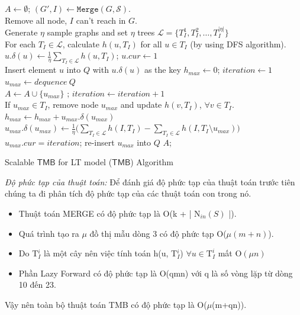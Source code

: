 \begin {itemize}
\begin{algorithm}[hpt]
	$A \leftarrow \emptyset$;	$(G', I) \leftarrow \mathtt{Merge}(G, \mathcal{S})$.
	\\
	Remove all node, $I$ can't reach in $G$.
	\\
	Generate $\eta$ sample graphs and set $\eta$ trees $\mathcal{L}=\{T_{I}^1, T_{I}^2, \ldots, T_{I}^{|\mathcal{\eta}|}\}$
	\\
	For each $ T_{I} \in \mathcal{L}$, calculate $h(u, T_{I})$ for all $u \in T_{I}$ (by using DFS algorithm).
	\\
	{
		$u.\delta(u) \leftarrow \frac{1}{\eta}\sum_{T_{I} \in \mathcal{L}} h(u, T_{I})$; $u. cur \leftarrow 1$
		\\
		Insert element $u$ into $Q$ with $u.\delta(u)$ as the key
	}
	$ h_{max} \leftarrow 0$; $iteration \leftarrow 1$
	\\
	{
		$u_{max} \leftarrow  dequence \  Q$
		\\
		{
			$A \leftarrow A \cup \{u_{max}\}$ ; $iteration \leftarrow iteration+1 $
			\\
			{
				If $u_{max} \in T_{I}$, remove node $u_{max}$ and update $h(v, T_{I})$, $ \forall v \in T_{I}$.
			}
			$h_{max} \leftarrow h_{max}+ u_{max}.\delta(u_{max})$
		}
		{
			$u_{max}. \delta(u_{max}) \leftarrow  \frac{1}{\eta}\big(\sum_{T_{I} \in \mathcal{L}}h(I, T_{I}) - \sum_{T_{I} \in \mathcal{L}} h(I, T_{I} \setminus u_{max})\big)$
			\\
			$u_{max}. cur =iteration$; re-insert $u_{max}$ into $Q$
		}
	}
	\Return $A$;
	\caption{Scalable $\mathsf{TMB}$ for LT model ($\mathsf{TMB}$) Algorithm}
	\label{STMB}
\end{algorithm}				
\end {itemize}

{\itshape Độ phức tạp của thuật toán: }		
Để đánh giá độ phức tạp của thuật toán trước tiên chúng ta đi phân tích độ phức tạp của các thuật toán con trong nó.
\begin {itemize}
\item Thuật toán MERGE có độ phức tạp là O(k + | N$_{in}(S)$ |).

\item Quá trình tạo ra $\mu$ đồ thị mẫu dòng 3 có độ phức tạp O($\mu(m + n)$).

\item Do T$_{I}^i$ là một cây nên việc tính toán h(u, T$_{I}^i$) $\forall u \in \text{T}_{I}^i$ mất O$(\mu n)$ 

\item Phần Lazy Forward có độ phức tạp là O(qmn) với q là số vòng lặp từ dòng 10 đến 23.
\end {itemize}

Vậy nên toàn bộ thuật toán TMB có độ phức tạp là O($\mu$(m+qn)).
